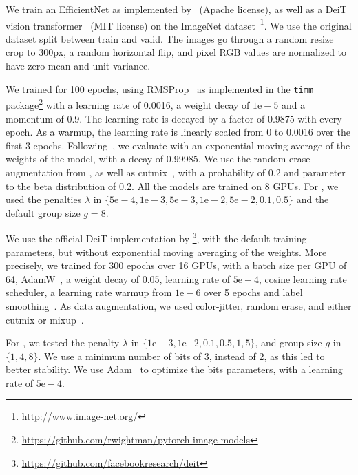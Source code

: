 We train an EfficientNet as implemented by~\citep{rw2019timm} (Apache license),
as well as a DeiT vision transformer~\citep{touvron2020training} (MIT license) on the ImageNet dataset~\cite{imagenet_cvpr09}\footnote{\url{http://www.image-net.org/}}. We use the original dataset
split between train and valid. 
The images go through a random resize crop to 300px, a random horizontal flip, and pixel RGB values are normalized
to have zero mean and unit variance.

We trained for 100 epochs, using RMSProp~\cite{tieleman2012lecture} as
implemented in the \texttt{timm} package\footnote{\url{https://github.com/rwightman/pytorch-image-models}}
with a learning rate of 0.0016, a weight decay of $1\mathrm{e}-5$ and a momentum of 0.9. The learning rate is decayed
by a factor of 0.9875 with every epoch. As a warmup, the learning rate is linearly scaled from 0 to 0.0016 over the first 3 epochs. Following~\citep{rw2019timm}, we evaluate with an exponential moving average of the weights of the model, with
a decay of 0.99985. We use the random erase augmentation from \citep{rw2019timm}, as well as cutmix~\citep{yun2019cutmix},
with a probability of 0.2 and parameter to the beta distribution of 0.2.
All the models are trained on 8 GPUs. For \diffq, we used the penalties $\lambda$ in 
$\{5\mathrm{e}{-}4, 1\mathrm{e}{-}3, 5\mathrm{e}{-}3, 1\mathrm{e}{-}2, 5\mathrm{e}{-}2, 0.1, 0.5\}$
and the default group size $g=8$.

We use the official DeiT implementation by \citet{touvron2020training}\footnote{\url{https://github.com/facebookresearch/deit}}, with the default
training parameters, but without exponential moving averaging of the weights. More precisely, we trained for 300 epochs over 16 GPUs, with a batch size per GPU of 64, AdamW~\citep{loshchilov2017decoupled}, a weight decay of 0.05, learning rate of $5\mathrm{e}{-}4$, cosine
learning rate scheduler, a learning rate warmup from $1\mathrm{e}{-}6$ over 5 epochs and label smoothing~\citep{szegedy2016rethinking}. As data augmentation, we used color-jitter, random erase, and either cutmix or mixup~\citep{zhang2017mixup}.

For \diffq, we tested the penalty $\lambda$ in $\{1\mathrm{e}{-}3, 1\mathrm{e}{-2}, 0.1, 0.5, 1, 5\}$,
and group size $g$ in $\{1, 4, 8\}$. We use a minimum number of bits of 3, instead of 2, as this led to better stability. 
We use Adam~\citep{adam} to optimize the bits parameters, with a learning rate of $5\mathrm{e}{-}{4}$.


